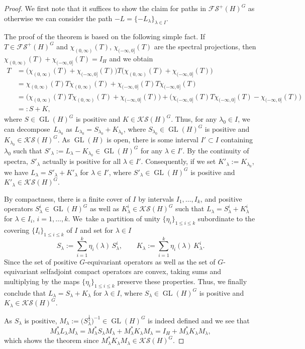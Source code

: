\documentclass[pdftex]{sigma}
\numberwithin{equation}{section}
\theoremstyle{definition}
\DeclareMathOperator{\GL}{GL}
\begin{document}
\begin{proof}
We first note that it suffices to show the claim for paths in $\mathcal{FS}^+(H)^G$ as otherwise we can consider the path $-L=\{-L_\lambda\}_{\lambda\in I}$.

The proof of the theorem is based on the following simple fact. If $T\in\mathcal{FS}^+(H)^G$ and $\chi_{(0,\infty)}(T)$, $\chi_{(-\infty,0]}(T)$ are the spectral projections, then $\chi_{(0,\infty)}(T)+\chi_{(-\infty,0]}(T)=I_H$ and we obtain
\begin{align*}
T&=\bigl(\chi_{(0,\infty)}(T)+\chi_{(-\infty,0]}(T)\bigr)T\bigl(\chi_{(0,\infty)}(T)+\chi_{(-\infty,0]}(T)\bigr)\\
&=\chi_{(0,\infty)}(T)T\chi_{(0,\infty)}(T)+\chi_{(-\infty,0]}(T)T\chi_{(-\infty,0]}(T)\\
&=\bigl(\chi_{(0,\infty)}(T)T\chi_{(0,\infty)}(T)+\chi_{(-\infty,0]}(T)\bigr)+\bigl(\chi_{(-\infty,0]}(T)T\chi_{(-\infty,0]}(T)-\chi_{(-\infty,0]}(T)\bigr)\\
&=:S+K,
\end{align*}
where $S\in\GL(H)^G$ is positive and $K\in\mathcal{KS}(H)^G$. Thus, for any $\lambda_0\in I$, we can decompose~$L_{\lambda_0}$ as $L_{\lambda_0}=S_{\lambda_0}+K_{\lambda_0}$, where $S_{\lambda_0}\in\GL(H)^G$ is positive and $K_{\lambda_0}\in\mathcal{KS}(H)^G$. As $\GL(H)$ is open, there is some interval $I'\subset I$ containing $\lambda_0$ such that $S'_\lambda:=L_\lambda-K_{\lambda_0}\in\GL(H)^G$ for any $\lambda\in I'$. By the continuity of spectra, $S'_\lambda$ actually is positive for all $\lambda\in I'$. Consequently, if we set $K'_\lambda:=K_{\lambda_0}$, we have $L_\lambda=S'_\lambda+K'_\lambda$ for $\lambda\in I'$, where $S'_\lambda\in\GL(H)^G$ is positive and $K'_\lambda\in\mathcal{KS}(H)^G$.

By compactness, there is a finite cover of $I$ by intervals $I_1,\dots, I_k$, and positive operators $S^i_\lambda\in\GL(H)^G$ as well as $K^i_\lambda\in\mathcal{KS}(H)^G$ such that $L_\lambda=S^i_\lambda+K^i_\lambda$ for $\lambda\in I_i$, $i=1,\dots,k$. We~take a partition of unity $\{\eta_i\}_{1\leq i\leq k}$ subordinate to the covering $\{I_i\}_{1\leq i\leq k}$ of $I$ and set for $\lambda\in I$
\[S_\lambda:=\sum^k_{i=1}{\eta_i(\lambda)\, S^i_\lambda},\qquad K_\lambda:=\sum^k_{i=1}{\eta_i(\lambda)\, K^i_\lambda}.\]
Since the set of positive $G$-equivariant operators as well as the set of $G$-equivariant selfadjoint compact operators are convex, taking sums and multiplying by the maps $\{\eta_i\}_{1\leq i\leq k}$ preserve these properties. Thus, we finally conclude that $L_\lambda=S_\lambda+K_\lambda$ for $\lambda\in I$, where $S_\lambda\in\GL(H)^G$ is positive and $K_\lambda\in\mathcal{KS}(H)^G$.

As $S_\lambda$ is positive, $M_\lambda:=\bigl(S^\frac{1}{2}_\lambda\bigr)^{-1}\in\GL(H)^G$ is indeed defined and we see that
\[M^\ast_\lambda L_\lambda M_\lambda=M^\ast_\lambda S_\lambda M_\lambda+M^\ast_\lambda K_\lambda M_\lambda=I_H+M^\ast_\lambda K_\lambda M_\lambda,\]
which shows the theorem since $M^\ast_\lambda K_\lambda M_\lambda\in\mathcal{KS}(H)^G$.
\end{proof}
\end{document}
